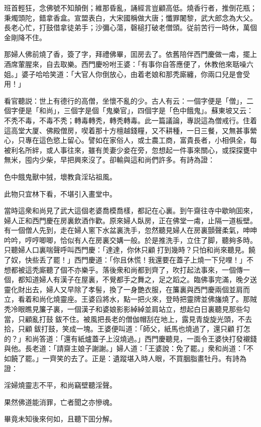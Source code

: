 \begin{myquote}
班首輕狂，念佛號不知顛倒；維那昏亂，誦經言豈顧高低。燒香行者，推倒花瓶；秉燭頭陀，錯拿香盒。宣盟表白，大宋國稱做大唐；懺罪闍黎，武大郎念為大父。長老心忙，打鼓借拿徒弟手；沙彌心蕩，磬槌打破老僧頭。従前苦行一時休，萬個金剛降不住。
\end{myquote}

那婦人佛前燒了香，簽了字，拜禮佛畢，囬房去了。依舊陪伴西門慶做一䖏，擺上酒席葷腥來，自去取樂。西門慶吩咐王婆：「有事你自答應便了，休教他來聒噪六姐。」婆子哈哈笑道：「大官人你倒放心，由着老娘和那秃廝纏，你兩口兒是會受用！」

看官聽説：世上有德行的高僧，坐懷不亂的少。古人有云：一個字便是「僧」，二個字便是「和尚」，三個字是個「鬼樂官」，四個字是「色中餓鬼」。蘇東坡又云：不秃不毒，不毒不秃；轉毒轉秃，轉秃轉毒。此一篇議論，專説這為僧戒行。住着這高堂大厦、佛殿僧房，喫着那十方檀越錢糧，又不耕種，一日三餐，又無甚事縈心，只專在這色慾上留心。譬如在家俗人，或士農工商，富貴長者，小相俱全，每被利名所絆，或人事往來，雖有羙妻少妾在旁，忽想起一件事來關心，或探探甕中無米，囤内少柴，早把興來沒了。卻輸與這和尚們許多。有詩為證：
\begin{myquote}
色中餓鬼獸中狨，壞教貪淫玷祖風。

此物只宜林下看，不堪引入畫堂中。
\end{myquote}

當時這衆和尚見了武大這個老婆喬模喬樣，都記在心裏。到午齋往寺中歇晌囬來，婦人正和西門慶在房裏飲酒作歡。原來婦人臥房，正在佛堂一䖏，止隔一道板壁。有一個僧人先到，走在婦人窻下水盆裏洗手，忽然聽見婦人在房裏顫聲柔氣，呻呻吟吟，哼哼唧唧，恰似有人在房裏交媾一般。於是推洗手，立住了脚，聽夠多時。只聽婦人口裏喘聲呼叫西門慶：「達達，你休只顧𢵞打到幾時？只怕和尚來聽見。饒了奴，快些丢了罷！」西門慶道：「你且休慌！我還要在蓋子上燒一下兒哩！」不想都被這秃廝聽了個不亦樂乎。落後衆和尚都到齊了，吹打起法事來，一個傳一個，都知道婦人有漢子在屋裏，不覺都手之舞之，足之蹈之。臨佛事完滿，晚夕送靈化財出去，婦人又早除了孝髻，換了一身艷衣服，在簾裏與西門慶兩個並肩而立，看着和尚化燒靈座。王婆舀將水，點一把火來，登時把靈牌並佛旛燒了。那賊秃冷眼瞧見簾子裏，一個漢子和婆娘影影綽綽並肩站立，想起白日裏聽見那些勾當，只顧亂打鼓𢵞鈸不住。被風把長老的僧伽帽刮在地上，露見青旋旋光頭，不去拾，只顧𢵞鈸打鼓，笑成一塊。王婆便叫道：「師父，紙馬也燒過了，還只顧𢵞打怎的？」和尚答道：「還有紙爐蓋子上沒燒過。」西門慶聽見，一面令王婆快打發襯錢與他。長老道：「請齋主娘子謝謝。」婦人道：「王婆說：免了罷。」衆和尚道：「不如饒了罷。」一齊笑的去了。正是：遺蹤堪入時人眼，不買胭脂畫牡丹。有詩為證：
\begin{myquote}
淫婦燒靈志不平，和尚竊壁聽淫聲。

果然佛道能消罪，亡者聞之亦慘魂。
\end{myquote}

畢竟未知後來何如，且聽下囬分解。

